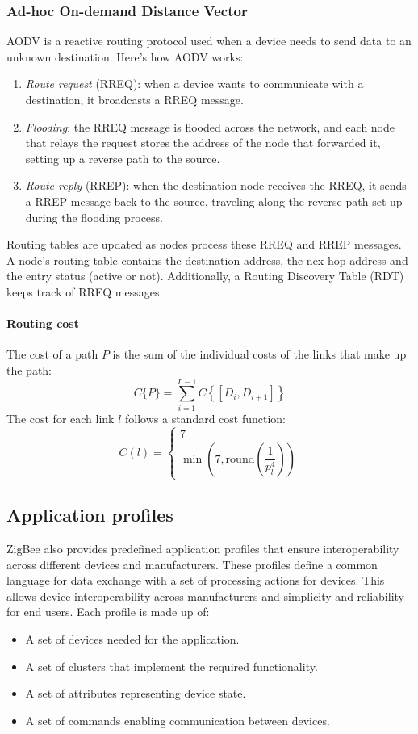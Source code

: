 \subsubsection{Ad-hoc On-demand Distance Vector}
AODV is a reactive routing protocol used when a device needs to send data to an unknown destination. 
Here's how AODV works:
\begin{enumerate}
    \item \textit{Route request} (RREQ): when a device wants to communicate with a destination, it broadcasts a RREQ message.
    \item \textit{Flooding}: the RREQ message is flooded across the network, and each node that relays the request stores the address of the node that forwarded it, setting up a reverse path to the source.
    \item \textit{Route reply} (RREP): when the destination node receives the RREQ, it sends a RREP message back to the source, traveling along the reverse path set up during the flooding process.
\end{enumerate}
\noindent Routing tables are updated as nodes process these RREQ and RREP messages. 
A node's routing table contains the destination address, the nex-hop address and the entry status (active or not).
Additionally, a Routing Discovery Table (RDT) keeps track of RREQ messages.

\paragraph*{Routing cost}
The cost of a path $P$ is the sum of the individual costs of the links that make up the path: 
\[C\{P\}=\sum_{i=1}^{L-1}C\left\{\left[D_i,D_{i+1}\right]\right\}\]
\noindent The cost for each link $l$ follows a standard cost function: 
\[C(l)=\begin{cases}7\\\min\left(7,\text{round}\left(\dfrac{1}{p_l^4}\right)\right)\end{cases}\]

\subsection{Application profiles}
ZigBee also provides predefined application profiles that ensure interoperability across different devices and manufacturers. 
These profiles define a common language for data exchange with a set of processing actions for devices.
This allows device interoperability across manufacturers and simplicity and reliability for end users.
Each profile is made up of:
\begin{itemize}
    \item A set of devices needed for the application.
    \item A set of clusters that implement the required functionality.
    \item A set of attributes representing device state.
    \item A set of commands enabling communication between devices.
\end{itemize}